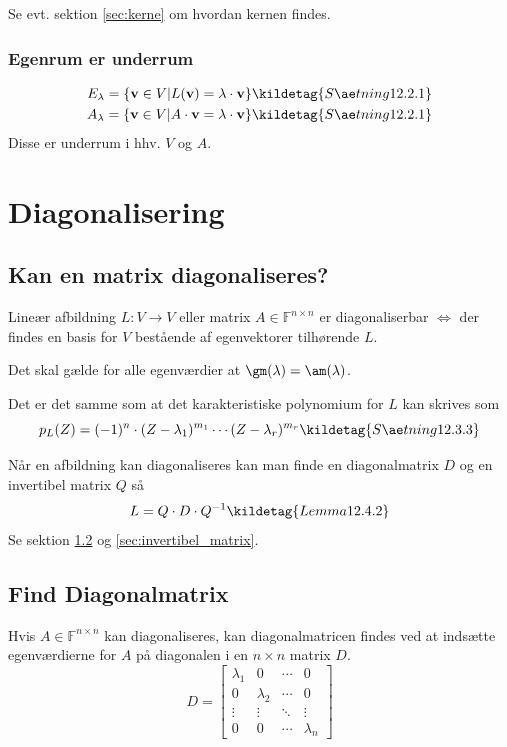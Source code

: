 Se evt. sektion \ref{sec:kerne} om hvordan kernen findes.

\subsubsection{Egenrum er underrum}
\begin{align*}
    E_\lambda = \{ \mathbf{v} \in V | L(\mathbf{v}) = \lambda \cdot \mathbf{v} \} \kildetag{Sætning 12.2.1} \\
    A_\lambda = \{ \mathbf{v} \in V |A \cdot \mathbf{v} = \lambda \cdot \mathbf{v} \} \kildetag{Sætning 12.2.1}
\end{align*}
Disse er underrum i hhv. $V$ og $A$.

\section{Diagonalisering}

\subsection{Kan en matrix diagonaliseres?}
Lineær afbildning $L: V \to V$ eller matrix $A \in \mathbb{F}^{n \times n}$ er diagonaliserbar $\iff$ der findes en basis for $V$ bestående af egenvektorer tilhørende $L$.

Det skal gælde for alle egenværdier at $\gm(\lambda) = \am(\lambda)$.

Det er det samme som at det karakteristiske polynomium for $L$ kan skrives som
\[
p_L(Z) = (-1)^n \cdot (Z - \lambda_1)^{m_1} \cdots (Z - \lambda_r)^{m_r}
\kildetag{Sætning 12.3.3}
\]

Når en afbildning kan diagonaliseres kan man finde en diagonalmatrix $D$ og en invertibel matrix $Q$ så
\[
L = Q \cdot D \cdot Q^{-1} \kildetag{Lemma 12.4.2}
\]
Se sektion \ref{sec:diagonal_matrix} og \ref{sec:invertibel_matrix}.

\subsection{Find Diagonalmatrix}
\label{sec:diagonal_matrix}
Hvis $A \in \mathbb{F}^{n \times n}$ kan diagonaliseres, kan diagonalmatricen findes ved at indsætte egenværdierne for $A$ på diagonalen i en $n \times n$ matrix $D$.
\[D = 
\begin{bmatrix}
    \lambda_1 & 0 & \cdots & 0 \\
    0 & \lambda_2 & \cdots & 0 \\
    \vdots & \vdots & \ddots & \vdots \\
    0 & 0 & \cdots & \lambda_n
\end{bmatrix}\]

